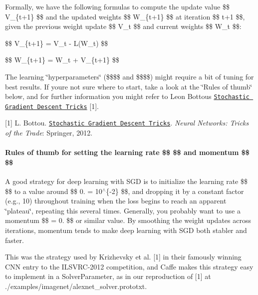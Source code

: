 Formally, we have the following formulas to compute the update value \$\$ V\+\_\+\{t+1\} \$\$ and the updated weights \$\$ W\+\_\+\{t+1\} \$\$ at iteration \$\$ t+1 \$\$, given the previous weight update \$\$ V\+\_\+t \$\$ and current weights \$\$ W\+\_\+t \$\$\+:

\$\$ V\+\_\+\{t+1\} =  V\+\_\+t -\/   L(\+W\+\_\+t) \$\$

\$\$ W\+\_\+\{t+1\} = W\+\_\+t + V\+\_\+\{t+1\} \$\$

The learning \char`\"{}hyperparameters\char`\"{} (\$\$\$\$ and \$\$\$\$) might require a bit of tuning for best results. If you\textquotesingle{}re not sure where to start, take a look at the \char`\"{}\+Rules of thumb\char`\"{} below, and for further information you might refer to Leon Bottou\textquotesingle{}s \href{http://research.microsoft.com/pubs/192769/tricks-2012.pdf}{\tt Stochastic Gradient Descent Tricks} \mbox{[}1\mbox{]}.

\mbox{[}1\mbox{]} L. Bottou. \href{http://research.microsoft.com/pubs/192769/tricks-2012.pdf}{\tt Stochastic Gradient Descent Tricks}. {\itshape Neural Networks\+: Tricks of the Trade}\+: Springer, 2012.

\paragraph*{Rules of thumb for setting the learning rate \$\$  \$\$ and momentum \$\$  \$\$}

A good strategy for deep learning with S\+GD is to initialize the learning rate \$\$  \$\$ to a value around \$\$   0. = 10$^\wedge$\{-\/2\} \$\$, and dropping it by a constant factor (e.\+g., 10) throughout training when the loss begins to reach an apparent \char`\"{}plateau\char`\"{}, repeating this several times. Generally, you probably want to use a momentum \$\$  = 0. \$\$ or similar value. By smoothing the weight updates across iterations, momentum tends to make deep learning with S\+GD both stabler and faster.

This was the strategy used by Krizhevsky et al. \mbox{[}1\mbox{]} in their famously winning C\+NN entry to the I\+L\+S\+V\+R\+C-\/2012 competition, and Caffe makes this strategy easy to implement in a {\ttfamily Solver\+Parameter}, as in our reproduction of \mbox{[}1\mbox{]} at {\ttfamily ./examples/imagenet/alexnet\+\_\+solver.prototxt}.

